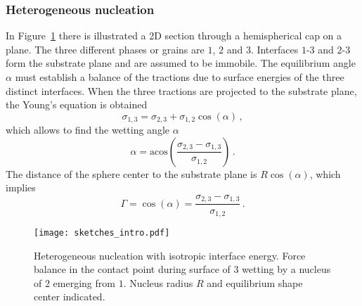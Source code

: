         \subsubsection{Heterogeneous nucleation}
        In Figure~\ref{fig_isotropic_wetting} there is illustrated a 2D section through a hemispherical cap on a plane. The three different phases or grains are $\mathit{1}$, $\mathit{2}$ and $\mathit{3}$. Interfaces $\mathit{1}$-$\mathit{3}$ and $\mathit{2}$-$\mathit{3}$ form the substrate plane and are assumed to be immobile. The equilibrium angle $\alpha$ must establish a balance of the tractions due to surface energies of the three distinct interfaces. When the three tractions are projected to the substrate plane, the Young's equation is obtained
        \begin{equation}
            \sigma_{1,3} = \sigma_{2,3} + \sigma_{1,2}\cos(\alpha) \,,
        \end{equation}
        which allows to find the wetting angle $\alpha$ 
        \begin{equation}
            \alpha = \mathrm{acos}\left(\frac{\sigma_{2,3}-\sigma_{1,3}}{\sigma_{1,2}}\right) \,.
        \end{equation}
        The distance of the sphere center to the substrate plane is $R\cos(\alpha)$, which implies
        \begin{equation}
            \Gamma = \cos(\alpha) = \frac{\sigma_{2,3}-\sigma_{1,3}}{\sigma_{1,2}} \,.
        \end{equation}
        
        \begin{figure}
            \centering
            \texttt{[image: sketches\_intro.pdf]}
            \caption[Sketch - heterogeneous nucleus with isotropic interface energy]{Heterogeneous nucleation with isotropic interface energy. Force balance in the contact point during surface of $\mathit{3}$ wetting by a nucleus of $\mathit{2}$ emerging from $\mathit{1}$. Nucleus radius $R$ and equilibrium shape center indicated.}
            \label{fig_isotropic_wetting}
        \end{figure}
        
